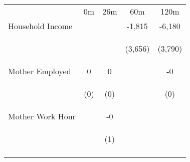 \begin{tabular}{lcccc}
\hline \noalign{\smallskip} & 0m & 26m & 60m & 120m\\
\noalign{\smallskip}\hline \noalign{\smallskip}Household Income &  &  & -1,815 & -6,180\\
 & \begin{footnotesize}\end{footnotesize} & \begin{footnotesize}\end{footnotesize} & \begin{footnotesize}(3,656)\end{footnotesize} & \begin{footnotesize}(3,790)\end{footnotesize}\\
\noalign{\smallskip}Mother Employed & 0 & 0 &  & -0\\
 & \begin{footnotesize}(0)\end{footnotesize} & \begin{footnotesize}(0)\end{footnotesize} & \begin{footnotesize}\end{footnotesize} & \begin{footnotesize}(0)\end{footnotesize}\\
\noalign{\smallskip}Mother Work Hour &  & -0 &  & \\
 & \begin{footnotesize}\end{footnotesize} & \begin{footnotesize}(1)\end{footnotesize} & \begin{footnotesize}\end{footnotesize} & \begin{footnotesize}\end{footnotesize}\\
\noalign{\smallskip}\hline\end{tabular}\\
